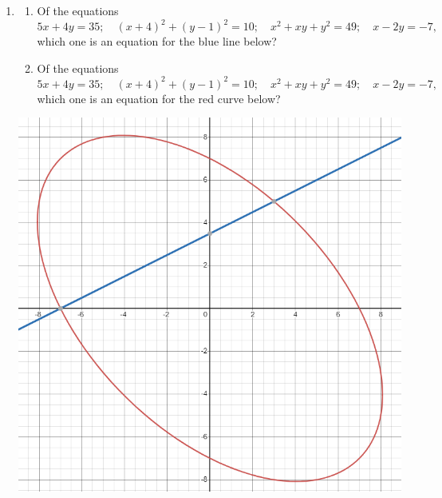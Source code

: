 \documentclass{article}
\begin{document}
\begin{enumerate}
\begin{enumerate}
\end{enumerate}
\item \begin{enumerate}
\item Of the equations
\begin{equation*}
5x + 4y = 35;\quad (x + 4)^2 + (y - 1)^2 = 10;\quad x^2 + xy + y^2 = 49;\quad x - 2y = -7,
\end{equation*}
which one is an equation for the blue line below?
\item Of the equations
\begin{equation*}
5x + 4y = 35;\quad (x + 4)^2 + (y - 1)^2 = 10;\quad x^2 + xy + y^2 = 49;\quad x - 2y = -7,
\end{equation*}
which one is an equation for the red curve below?
\end{enumerate}
\begin{center}
\includegraphics[scale=0.5]{03.png}
\end{center}
\end{enumerate}
\end{document}

